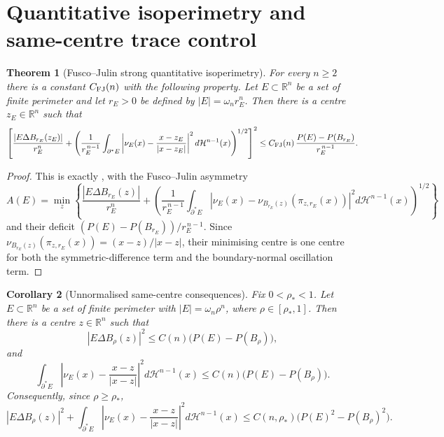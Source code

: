 \documentclass[11pt]{amsart}
\newtheorem{theorem}{Theorem}[section]
\newtheorem{corollary}[theorem]{Corollary}
\theoremstyle{definition}
\newcommand{\R}{\mathbb R}
\newcommand{\rstar}{\rho_*}
\newcommand{\Hn}{\mathcal H^{n-1}}
\newcommand{\Per}{P}
\begin{document}
\section{Quantitative isoperimetry and same-centre trace control}
\label{sec:samecentre}

\begin{theorem}[Fusco--Julin strong quantitative isoperimetry]
\label{thm:FJ-strong}
For every \(n\ge2\) there is a constant \(C_{\rm FJ}(n)\) with the
following property.  Let \(E\subset\R^n\) be a set of finite perimeter and
let \(r_E>0\) be defined by \(|E|=\omega_n r_E^n\).  Then there is a
centre \(z_E\in\R^n\) such that
\begin{equation}\label{eq:FJ-exact}
   \left[
      \frac{|E\Delta B_{r_E}(z_E)|}{r_E^n}
      +
      \left(
         \frac1{r_E^{\,n-1}}
         \int_{\partial^*E}
            \left|\nu_E(x)-\frac{x-z_E}{|x-z_E|}\right|^2
         d\Hn(x)
      \right)^{1/2}
   \right]^2
   \le
   C_{\rm FJ}(n)\,
   \frac{\Per(E)-\Per(B_{r_E})}{r_E^{\,n-1}} .
\end{equation}
\end{theorem}

\begin{proof}
This is exactly \cite[Theorem~1.1]{FJ2014}, with the Fusco--Julin
asymmetry
\[
   A(E)=\min_z\left\{
      \frac{|E\Delta B_{r_E}(z)|}{r_E^n}
      +
      \left(
         \frac1{r_E^{\,n-1}}
         \int_{\partial^*E}
            \left|\nu_E(x)-\nu_{B_{r_E}(z)}
               (\pi_{z,r_E}(x))\right|^2d\Hn(x)
      \right)^{1/2}
   \right\}
\]
and their deficit
\((\Per(E)-\Per(B_{r_E}))/r_E^{\,n-1}\).  Since
\(\nu_{B_{r_E}(z)}(\pi_{z,r_E}(x))=(x-z)/|x-z|\), their minimising centre
is one centre for both the symmetric-difference term and the boundary-normal
oscillation term.
\end{proof}

\begin{corollary}[Unnormalised same-centre consequences]
\label{cor:FJ-unnormalised}
Fix \(0<\rstar<1\).  Let \(E\subset\R^n\) be a set of finite perimeter with
\(|E|=\omega_n\rho^n\), where \(\rho\in[\rstar,1]\).  Then there is a
centre \(z\in\R^n\) such that
\begin{equation}\label{eq:FJ-volume}
   |E\Delta B_\rho(z)|^2
   \le C(n)\bigl(\Per(E)-\Per(B_\rho)\bigr),
\end{equation}
and
\begin{equation}\label{eq:FJ-normal}
   \int_{\partial^*E}
      \left|\nu_E(x)-\frac{x-z}{|x-z|}\right|^2d\Hn(x)
   \le C(n)\bigl(\Per(E)-\Per(B_\rho)\bigr).
\end{equation}
Consequently, since \(\rho\ge\rstar\),
\begin{equation}\label{eq:FJ-DI-version}
   |E\Delta B_\rho(z)|^2
   +
   \int_{\partial^*E}
      \left|\nu_E(x)-\frac{x-z}{|x-z|}\right|^2d\Hn(x)
   \le C(n,\rstar)
      \bigl(\Per(E)^2-\Per(B_\rho)^2\bigr).
\end{equation}
\end{corollary}
\end{document}

